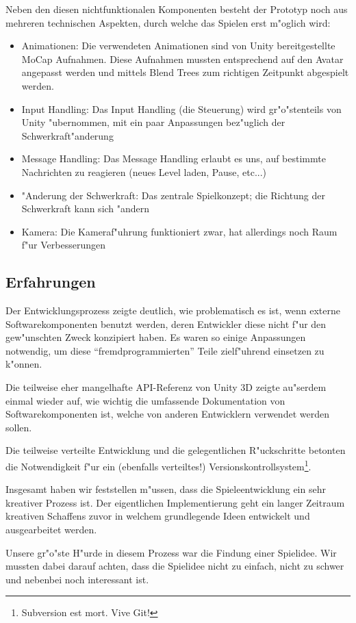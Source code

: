 Neben den diesen nichtfunktionalen Komponenten besteht der Prototyp noch aus mehreren technischen
Aspekten, durch welche das Spielen erst m"oglich wird:
\begin{itemize}
	\item Animationen: Die verwendeten Animationen sind von Unity bereitgestellte MoCap Aufnahmen.
		Diese Aufnahmen mussten entsprechend auf den Avatar angepasst werden und mittels Blend Trees zum
		richtigen Zeitpunkt abgespielt werden.
	\item Input Handling: Das Input Handling (die Steuerung) wird gr"o"stenteils von Unity "ubernommen,
		mit ein paar Anpassungen bez"uglich der Schwerkraft"anderung
	\item Message Handling: Das Message Handling erlaubt es uns, auf bestimmte Nachrichten zu reagieren
			(neues Level laden, Pause, etc...)
	\item "Anderung der Schwerkraft: Das zentrale Spielkonzept; die Richtung der Schwerkraft kann sich "andern
	\item Kamera: Die Kameraf"uhrung funktioniert zwar, hat allerdings noch Raum f"ur Verbesserungen
\end{itemize}
%
\subsection{Erfahrungen}
\label{sec:results/xp}
%
Der Entwicklungsprozess zeigte deutlich, wie problematisch es
ist, wenn externe Softwarekomponenten benutzt werden, deren
Entwickler diese nicht f"ur den gew"unschten Zweck konzipiert haben.
Es waren so einige Anpassungen notwendig, um diese
``fremdprogrammierten'' Teile zielf"uhrend einsetzen zu k"onnen.

Die teilweise eher mangelhafte API-Referenz von Unity 3D zeigte
au"serdem einmal wieder auf, wie wichtig die umfassende Dokumentation
von Softwarekomponenten ist, welche von anderen Entwicklern
verwendet werden sollen.

Die teilweise verteilte Entwicklung und die gelegentlichen R"uckschritte
betonten die Notwendigkeit f"ur ein (ebenfalls verteiltes!)
Versionskontrollsystem\footnote{Subversion est mort. Vive Git!}.

Insgesamt haben wir feststellen m"ussen, dass die Spieleentwicklung ein sehr kreativer Prozess ist.
Der eigentlichen Implementierung geht ein langer Zeitraum kreativen Schaffens zuvor in welchem
grundlegende Ideen entwickelt und ausgearbeitet werden.

Unsere gr"o"ste H"urde in diesem Prozess war die Findung einer Spielidee.
Wir mussten dabei darauf achten, dass die Spielidee nicht zu einfach, nicht
zu schwer und nebenbei noch interessant ist.
%
